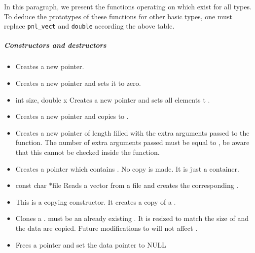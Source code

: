In this paragraph, we present the functions operating on 
which exist for all types. To deduce the prototypes of these functions for
other basic types, one must replace {\tt pnl_vect} and {\tt double} according
the above table. 
\subparagraph{Constructors and destructors}
\begin{itemize}
\item {}
  \sshortdescribe Creates a new  pointer.  
\item {}
  \sshortdescribe Creates a new  pointer and sets it to zero.  
\item {}
  {int size, double x}
  \sshortdescribe Creates a new  pointer and sets all
  elements t .  
\item {}
  \sshortdescribe Creates a new  pointer and copies 
  to .  
\item {}
  \sshortdescribe Creates a new  pointer of length
   filled with the extra arguments passed to the function. The
  number of extra arguments passed must be equal to , be aware that
  this cannot be checked inside the function.
\item {}
  \sshortdescribe Creates a  pointer which contains
  . No copy is made. It is just a container.
  
\item {}
  {const char $\ast$file}
  \sshortdescribe Reads a vector from a file and creates the corresponding
  .  

\item {}
  \sshortdescribe This is a copying constructor. It creates a copy of a .
\item {} 
  \sshortdescribe Clones a .  must be an
  already existing  . It is resized to match the size of
   and the data are copied. Future modifications to  will not
  affect .

\item {}
  \sshortdescribe Frees a  pointer and set the data pointer to NULL  
\end{itemize}

